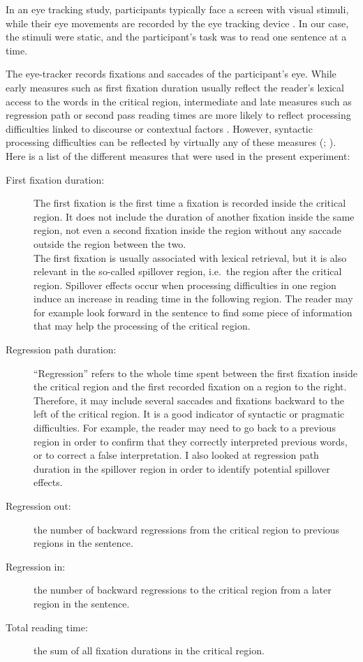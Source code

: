 In an eye tracking study, participants typically face a screen with visual stimuli, while their eye movements are recorded by the eye tracking device \citep[33--35]{Conklin.2018}. In our case, the stimuli were static, and the participant's task was to read one sentence at a time.

The eye-tracker records fixations and saccades of the participant's eye. While early measures such as first fixation duration usually reflect the reader's lexical access to the words in the critical region, intermediate and late measures such as regression path or second pass reading times are more likely to reflect processing difficulties linked to discourse or contextual factors \citep[Section 3.2.1]{Conklin.2018}. However, syntactic processing difficulties can be reflected by virtually any of these measures (\citealt{Clifton.2007}; \citealt[90]{Conklin.2018}). Here is a list of the different measures that were used in the present experiment:

\begin{description}
    \item[First fixation duration:] The first fixation is the first time a fixation is recorded inside the critical region. It does not include the duration of another fixation inside the same region, not even a second fixation inside the region without any saccade outside the region between the two. \\ 
    The first fixation is usually associated with lexical retrieval, but it is also relevant in the so-called spillover region, i.e.\ the region after the critical region. Spillover effects occur when processing difficulties in one region induce an increase in reading time in the following region. The reader may for example look forward in the sentence to find some piece of information that may help the processing of the critical region.
    \item[Regression path duration:] ``Regression'' refers to the whole time spent between the first fixation inside the critical region and the first recorded fixation on a region to the right. Therefore, it may include several saccades and fixations backward to the left of the critical region. It is a good indicator of syntactic or pragmatic difficulties. For example, the reader may need to go back to a previous region in order to confirm that they correctly interpreted previous words, or to correct a false interpretation. I also looked at regression path duration in the spillover region in order to identify potential spillover effects.
    \item[Regression out:] the number of backward regressions from the critical region to previous regions in the sentence.
    \item[Regression in:] the number of backward regressions to the critical region from a later region in the sentence.
    \item[Total reading time:] the sum of all fixation durations in the critical region.
\end{description}

